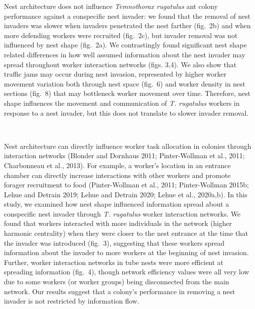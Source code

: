 \documentclass[3p]{elsarticle} %
\begin{document}
Nest architecture does not influence \emph{Temnothorax rugatulus} ant
colony performance against a conspecific nest invader: we found that the
removal of nest invaders was slower when invaders penetrated the nest
farther (fig.~2b) and when more defending workers were recruited
(fig.~2c), but invader removal was not influenced by nest shape
(fig.~2a). We contrastingly found significant nest shape related
differences in how well assumed information about the nest invader may
spread throughout worker interaction networks (figs. 3,4). We also show
that traffic jams may occur during nest invasion, represented by higher
worker movement variation both through nest space (fig.~6) and worker
density in nest sections (fig.~8) that may bottleneck worker movement
over time. Therefore, nest shape influences the movement and
communication of \emph{T. rugatulus} workers in response to a nest
invader, but this does not translate to slower invader removal.

~

Nest architecture can directly influence worker task allocation in
colonies through interaction networks (Blonder and Dornhaus 2011;
Pinter-Wollman et al., 2011; Charbonneau et al., 2013). For example, a
worker's location in an entrance chamber can directly increase
interactions with other workers and promote forager recruitment to food
(Pinter-Wollman et al., 2011; Pinter-Wollman 2015b; Lehue and Detrain
2019; Lehue and Detrain 2020; Lehue et al., 2020a,b). In this study, we
examined how nest shape influenced information spread about a
conspecific nest invader through \emph{T. rugatulus} worker interaction
networks. We found that workers interacted with more individuals in the
network (higher harmonic centrality) when they were closer to the nest
entrance at the time that the invader was introduced (fig.~3),
suggesting that these workers spread information about the invader to
more workers at the beginning of nest invasion. Further, worker
interaction networks in tube nests were more efficient at spreading
information (fig.~4), though network efficiency values were all very low
due to some workers (or worker groups) being disconnected from the main
network. Our results suggest that a colony's performance in removing a
nest invader is not restricted by information flow.

~
\end{document}
